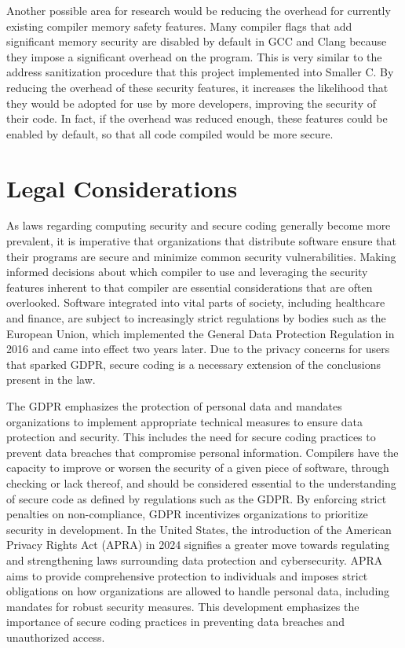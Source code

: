 \documentclass[sigconf, anonymous]{acmart}
\begin{document}
Another possible area for research would be reducing the overhead for currently existing compiler memory safety features. Many compiler flags that add significant memory security are disabled by default in GCC and Clang because they impose a significant overhead on the program. This is very similar to the address sanitization procedure that this project implemented into Smaller C. By reducing the overhead of these security features, it increases the likelihood that they would be adopted for use by more developers, improving the security of their code. In fact, if the overhead was reduced enough, these features could be enabled by default, so that all code compiled would be more secure.

\section{Legal Considerations}
\label{legal considerations}

As laws regarding computing security and secure coding generally become more prevalent, it is imperative that organizations that distribute software ensure that their programs are secure and minimize common security vulnerabilities. Making informed decisions about which compiler to use and leveraging the security features inherent to that compiler are essential considerations that are often overlooked. Software integrated into vital parts of society, including healthcare and finance, are subject to increasingly strict regulations by bodies such as the European Union, which implemented the General Data Protection Regulation in 2016\cite{gdpr2016} and came into effect two years later. Due to the privacy concerns for users that sparked GDPR, secure coding is a necessary extension of the conclusions present in the law.

The GDPR emphasizes the protection of personal data and mandates organizations to implement appropriate technical measures to ensure data protection and security. This includes the need for secure coding practices to prevent data breaches that compromise personal information. Compilers have the capacity to improve or worsen the security of a given piece of software, through checking or lack thereof, and should be considered essential to the understanding of secure code as defined by regulations such as the GDPR. By enforcing strict penalties on non-compliance, GDPR incentivizes organizations to prioritize security in development. In the United States, the introduction of the American Privacy Rights Act (APRA) in 2024 signifies a greater move towards regulating and strengthening laws surrounding data protection and cybersecurity\cite{apra2024}. APRA aims to provide comprehensive protection to individuals and imposes strict obligations on how organizations are allowed to handle personal data, including mandates for robust security measures. This development emphasizes the importance of secure coding practices in preventing data breaches and unauthorized access.
\end{document}
